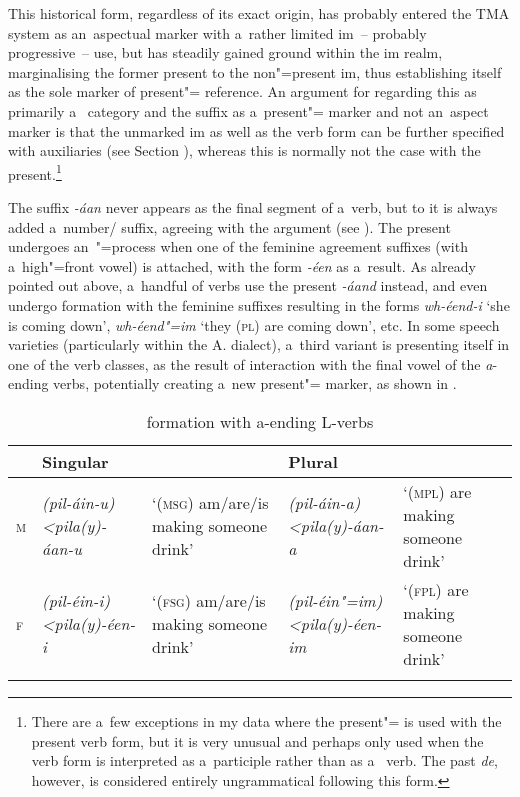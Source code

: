 This historical  form, regardless of its exact origin, has probably entered the TMA system as an~aspectual marker with a~rather limited im~-- probably progressive~-- use, but has steadily gained ground within the im realm, marginalising the former present  to the non"=present im, thus establishing itself as the sole marker of present"= reference. An argument for regarding this as primarily a~ category and the suffix as a~present"= marker and not an~aspect marker is that the unmarked im as well as the  verb form can be further specified with  auxiliaries (see Section ), whereas this is normally not the case with the present.\footnote{There are a~few exceptions in my data where the present"=  is used with the present verb form, but it is very unusual and perhaps only used when the verb form is interpreted as a~participle rather than as a~ verb. The past  \textit{de}, however, is considered entirely ungrammatical following this form.} 


The suffix \textit{-áan} never appears as the final segment of a~verb, but to it is always added a~number/ suffix, agreeing with the  argument (see ). The present   undergoes an~"=process when one of the feminine agreement suffixes (with a~high"=front vowel) is attached, with the form \textit{-éen} as a~result. As already pointed out above, a~handful of verbs use the present   \textit{-áand} instead, and even undergo  formation with the feminine suffixes resulting in the forms \textit{wh-éend-i} `she is coming down', \textit{wh-éend"=im} `they (\textsc{pl}) are coming down', etc. In some speech varieties (particularly within the A. dialect), a~third variant is presenting itself in one of the verb classes, as the result of interaction with the final vowel of the \textit{a}-ending verbs, potentially creating a~new  present"= marker, as shown in .


\begin{table}[ht]
\caption{ formation with a-ending L-verbs}
\begin{tabularx}{\textwidth}{ l P{25mm} Q P{25mm} Q }
\lsptoprule
&
Singular &
&
Plural &
\\\hline
\textsc{m}
&
\textit{(pil-áin-u)}
\textit{{\textless}pila(y)-áan-u} &
`(\textsc{msg}) am/are/is making someone drink' &
\textit{(pil-áin-a)}
\textit{{\textless}pila(y)-áan-a} &
`(\textsc{mpl}) are making someone drink'\\
\textsc{f}
&
\textit{(pil-éin-i)}
\textit{{\textless}pila(y)-éen-i} &
`(\textsc{fsg}) am/are/is making someone drink' &
\textit{(pil-éin"=im)}
\textit{{\textless}pila(y)-éen-im} &
`(\textsc{fpl}) are making someone drink'\\\lspbottomrule
\end{tabularx}
\label{tab:8-25}
\end{table}



